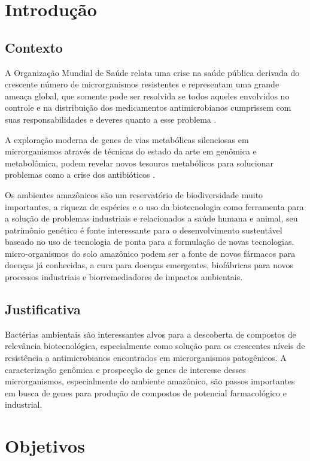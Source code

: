 \chapter{Introdução}
\label{cap:introducao}

\section{Contexto}

A Organização Mundial de Saúde relata uma crise na saúde pública derivada do crescente número
de microrganismos resistentes e representam uma grande ameaça global, que somente
pode ser resolvida se todos aqueles envolvidos no controle e na distribuição
dos medicamentos antimicrobianos cumprissem com suas responsabilidades e deveres 
quanto a esse problema \cite{talebi2019world}.

A exploração moderna de genes de vias metabólicas silenciosas em microrganismos
através de técnicas do estado da arte em genômica e metabolômica, podem
revelar novos tesouros metabólicos para solucionar problemas como a crise
dos antibióticos \cite{zhang2021glossary}.

Os ambientes amazônicos são um reservatório de biodiversidade muito importantes,
a riqueza de espécies e o uso da biotecnologia como ferramenta para a solução de problemas industriais  e relacionados
a saúde humana e animal, seu patrimônio genético é fonte interessante para o
desenvolvimento sustentável baseado no uso de tecnologia de ponta para a formulação de novas tecnologias.
micro-organismos do solo amazônico podem ser a fonte de novos fármacos para doenças já conhecidas,
a cura para doenças emergentes, biofábricas para novos processos industriais e biorremediadores
de impactos ambientais.

\section{Justificativa}
Bactérias ambientais são interessantes alvos para a descoberta de compostos
de relevância biotecnológica, especialmente como solução para os crescentes níveis
de resistência a antimicrobianos encontrados em microrganismos patogênicos.
A caracterização genômica e prospecção de genes de interesse desses microrganismos,
especialmente do ambiente amazônico, são passos importantes
em busca de genes para produção de compostos de potencial farmacológico e industrial.

\chapter{Objetivos}

